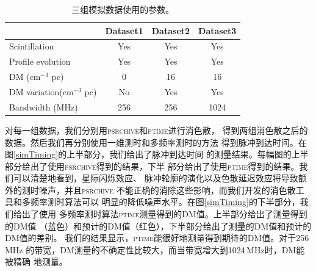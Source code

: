 \begin{table}
\begin{center}
\caption{三组模拟数据使用的参数。}
\label{simTable}
\begin{tabular}{lccc}
\hline
                           &    Dataset1   &   Dataset2    &   Dataset3   \\
\hline                                                                    
Scintillation              &     Yes       &   Yes         &    Yes       \\
Profile evolution          &     Yes       &   Yes         &    Yes       \\
DM (cm$^{-3}$ pc)          &     0         &   16          &    16        \\
DM variation(cm$^{-3}$ pc) &     No        &   Yes         &    Yes       \\
Bandwidth (MHz)            &     256       &   256         &    1024      \\
\hline
\end{tabular}
\end{center}
\end{table}

对每一组数据，我们分别用\textsc{psrchive}和\textsc{ptime}进行消色散，
得到两组消色散之后的数据。然后我们再分别使用一维测时和多频率测时的方法
得到脉冲到达时间。在图\ref{simTiming}的上半部分，我们给出了脉冲到达时间
的测量结果。每幅图的上半部分给出了使用\textsc{psrchive}得到的结果，下半
部分给出了使用\textsc{ptime}得到的结果。我们可以清楚地看到，星际闪烁效应、
脉冲轮廓的演化以及色散延迟效应将导致额外的测时噪声，并且\textsc{psrchive}
不能正确的消除这些影响，而我们开发的消色散工具和多频率测时算法可以
明显的降低噪声水平。在图\ref{simTiming}的下半部分，我们给出了使用
多频率测时算法\textsc{ptime}测量得到的DM值。上半部分给出了测量得到的DM值
（蓝色）和预计的DM值（红色），下半部分给出了测量的DM值和预计的DM值的差别。
我们的结果显示，\textsc{ptime}能很好地测量得到期待的DM值。对于256\,MHz
的带宽，DM测量的不确定性比较大，而当带宽增大到1024\,MHz时，DM能被精确
地测量。

